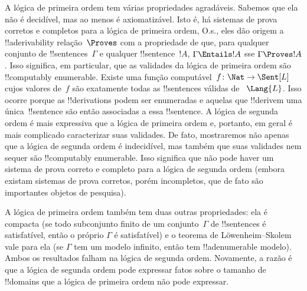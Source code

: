 \documentclass[../../../include/open-logic-section]{subfiles}
\begin{document}


A lógica de primeira ordem tem várias propriedades agradáveis. Sabemos que
ela não é decidível, mas ao menos é axiomatizável. Isto é, há sistemas de
prova corretos e completos para a lógica de primeira ordem, O.s.\@, eles
dão origem a !!a{derivability} relação~$\Proves$ com a propriedade de que,
para qualquer conjunto de !!{sentence}s~$\Gamma$ e qualquer
!!{sentence}~$!A$, $\Gamma \Entails !A$ sse $\Gamma \Proves !A$. Isso
significa, em particular, que as validades da lógica de primeira ordem são
!!{computably enumerable}. Existe uma função computável~$f\colon \Nat \to
\Sent[L]$ cujos valores de~$f$ são exatamente todas as !!{sentence}s válidas de
~$\Lang{L}$. Isso ocorre porque as !!{derivation}s podem ser enumeradas e
aquelas que !!{derive}m uma única~!!{sentence} são então associadas a essa
!!{sentence}. A lógica de segunda ordem é mais expressiva que a lógica de
primeira ordem e, portanto, em geral é mais complicado caracterizar suas
validades. De fato, mostraremos não apenas que a lógica de segunda ordem é
indecidível, mas também que suas validades nem sequer são !!{computably
  enumerable}. Isso significa que não pode haver um sistema de prova
correto e completo para a lógica de segunda ordem (embora existam sistemas
de prova corretos, porém incompletos, que de fato são importantes objetos
de pesquisa).

A lógica de primeira ordem também tem duas outras propriedades: ela é
compacta (se todo subconjunto finito de um conjunto~$\Gamma$ de
!!{sentence}s é satisfatível, então o próprio $\Gamma$ é satisfatível) e o
teorema de L\"owenheim--Skolem vale para ela (se $\Gamma$ tem um modelo
infinito, então tem !!a{denumerable} modelo). Ambos os resultados falham na
lógica de segunda ordem. Novamente, a razão é que a lógica de segunda ordem
pode expressar fatos sobre o tamanho de !!{domain}s que a lógica de primeira
ordem não pode expressar.
\end{document}
